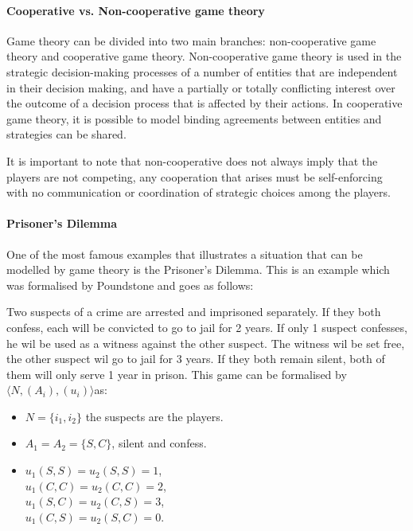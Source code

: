 \paragraph{Cooperative vs. Non-cooperative game theory} 
Game theory can be divided into two main branches: non-cooperative game theory and cooperative game theory. Non-cooperative game theory is used in the strategic decision-making processes of a number of entities that are independent in their decision making, and have a partially or totally conflicting interest over the outcome of a decision process that is affected by their actions\cite{keypaper}. In cooperative game theory, it is possible to model binding agreements between entities and strategies can be shared. 

It is important to note that non-cooperative does not always imply that the players are not competing, any cooperation that arises must be self-enforcing with no communication or coordination of strategic choices among the players.

\paragraph{Prisoner's Dilemma}
One of the most famous examples that illustrates a situation that can be modelled by game theory is the Prisoner's Dilemma. This is an example which was formalised by Poundstone \cite{poundstone} and goes as follows: 

Two suspects of a crime are arrested and imprisoned separately. If they both confess, each will be convicted to go to jail for 2 years. If only 1 suspect confesses, he wil be used as a witness against the other suspect. The witness wil be set free, the other suspect wil go to jail for 3 years. If they both remain silent, both of them will only serve 1 year in prison. This game can be formalised by $\langle N, (A_i), (u_i) \rangle$as:
\begin{itemize}
	\item $N = \{i_{1}, i_{2} \}$ the suspects are the players.
    \item $A_1 = A_2 = \{S, C\}$, silent and confess.
    \item $u_1(S, S) = u_2(S, S) = 1$, \\
    $u_1(C, C) = u_2(C, C) = 2$, \\
    $u_1(S, C) = u_2(C, S) = 3$, \\
    $u_1(C, S) = u_2(S, C) = 0$.

\end{itemize}

